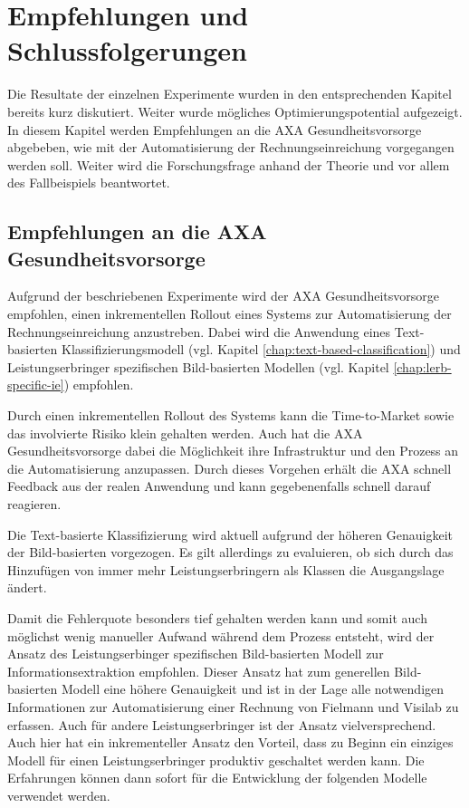 \cleardoublepage
\section{Empfehlungen und Schlussfolgerungen}
\label{chap:summary}

Die Resultate der einzelnen Experimente wurden in den entsprechenden Kapitel bereits kurz diskutiert. Weiter wurde mögliches Optimierungspotential aufgezeigt. In diesem Kapitel werden Empfehlungen an die AXA Gesundheitsvorsorge abgebeben, wie mit der Automatisierung der Rechnungseinreichung vorgegangen werden soll. Weiter wird die Forschungsfrage anhand der Theorie und vor allem des Fallbeispiels beantwortet.

\subsection{Empfehlungen an die AXA Gesundheitsvorsorge}


Aufgrund der beschriebenen Experimente wird der AXA Gesundheitsvorsorge empfohlen, einen inkrementellen Rollout eines Systems zur Automatisierung der Rechnungseinreichung anzustreben. Dabei wird die Anwendung eines Text-basierten Klassifizierungsmodell (vgl. Kapitel \ref{chap:text-based-classification}) und Leistungserbringer spezifischen Bild-basierten Modellen (vgl. Kapitel \ref{chap:lerb-specific-ie}) empfohlen.

Durch einen inkrementellen Rollout des Systems kann die Time-to-Market sowie das involvierte Risiko klein gehalten werden. Auch hat die AXA Gesundheitsvorsorge dabei die Möglichkeit ihre Infrastruktur und den Prozess an die Automatisierung anzupassen. Durch dieses Vorgehen erhält die AXA schnell Feedback aus der realen Anwendung und kann gegebenenfalls schnell darauf reagieren.

Die Text-basierte Klassifizierung wird aktuell aufgrund der höheren Genauigkeit der Bild-basierten vorgezogen. Es gilt allerdings zu evaluieren, ob sich durch das Hinzufügen von immer mehr Leistungserbringern als Klassen die Ausgangslage ändert.

Damit die Fehlerquote besonders tief gehalten werden kann und somit auch möglichst wenig manueller Aufwand während dem Prozess entsteht, wird der Ansatz des Leistungserbinger spezifischen Bild-basierten Modell zur Informationsextraktion empfohlen. Dieser Ansatz hat zum generellen Bild-basierten Modell eine höhere Genauigkeit und ist in der Lage alle notwendigen Informationen zur Automatisierung einer Rechnung von Fielmann und Visilab zu erfassen. Auch für andere Leistungserbringer ist der Ansatz vielversprechend. Auch hier hat ein inkrementeller Ansatz den Vorteil, dass zu Beginn ein einziges Modell für einen Leistungserbringer produktiv geschaltet werden kann. Die Erfahrungen können dann sofort für die Entwicklung der folgenden Modelle verwendet werden.

